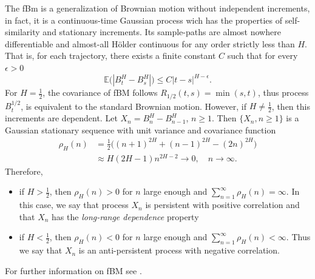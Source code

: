 \documentclass[smallextended]{svjour3}
\newcommand{\E}{\mathbb{E}}
\begin{document}
        The fBm is a generalization of Brownian motion without independent 
    increments, in fact,  it is a continuous-time Gaussian process wich
    has the properties of self-similarity and stationary increments. Its 
    sample-paths are almost nowhere differentiable and
    almost-all H\"{o}lder continuous for any order strictly less than $H$. That 
    is, for each trajectory, there exists a finite constant $C$ such that for 
    every$\epsilon > 0$
    \[
        \E \big(
            | B_t ^ H - B_s ^ H|
        \big)
        \le
        C |t - s| ^ {H - \epsilon} .
    \]
%
    For $H = \tfrac{1}{2} $, the covariance of fBM follows
    $
        R_{1 / 2} (t, s)
            = \min(s, t)
    $, thus process $B_t ^ {1 / 2}$, is equivalent to
    the standard Brownian motion. However, if $H \ne \tfrac{1}{2}$, 
    then this increments are dependent.
%
        Let  $X_n = B_n ^ H - B_{n - 1} ^ H$, $n \ge 1$.
    Then $\{X_n, n \ge 1\}$ is a Gaussian stationary sequence with unit
    variance and covariance function 
    \begin{align*}
        \rho_H (n) &=
            \frac{1}{2}
            \Big(
                (n + 1) ^ {2 H} + (n - 1) ^ {2 H}
                - (2 n) ^{2 H}
            \Big)
            \\
            &\approx
            H (2H - 1)n^{2H-2} \to 0, \quad n \to \infty.
    \end{align*}
    Therefore,
    \begin{itemize}
        \item
            if $H > \tfrac{1}{2}$, then $\rho_H(n) > 0$ for $n$ large enough and
            $\sum_{n=1}^\infty \rho_H(n)=\infty$. In this case, we say that
            process $X_n$ is persistent with positive correlation and that
            $X_n$ has the \emph{long-range dependence} property
        \item
            if $H < \tfrac{1}{2}$, then $\rho_H(n) < 0$ for $n$ large enough and
            $\sum_{n=1}^\infty \rho_H(n)<\infty$. Thus we say that $X_n$ is an 
            anti-persistent process with negative correlation.
    \end{itemize}
    For further information on fBM see \cite{ra,nu,mi}.
    
\end{document}
